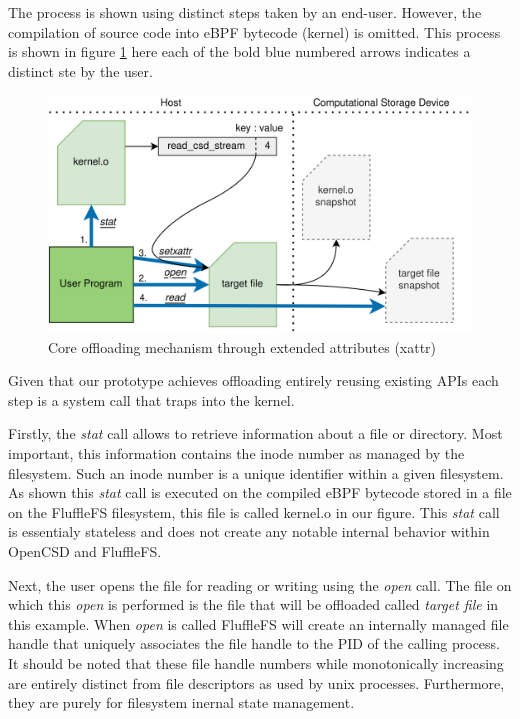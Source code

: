 The process is shown using distinct steps taken by an end-user. However, the
compilation of source code into eBPF bytecode (kernel) is omitted. This process
is shown in figure \ref{figure:offloading} here each of the bold blue numbered
arrows indicates a distinct ste by the user.

\begin{figure}
    \centering
	\includegraphics[width=1\textwidth]{resources/images/offloading.png}
	\caption{Core offloading mechanism through extended attributes (xattr)}
    \label{figure:offloading}
\end{figure}

Given that our prototype achieves offloading entirely reusing existing APIs each
step is a system call that traps into the kernel.

Firstly, the \textit{stat} call allows to retrieve information about a file or
directory. Most important, this information contains the inode number as managed
by the filesystem. Such an inode number is a unique identifier within a given
filesystem. As shown this \textit{stat} call is executed on the compiled eBPF
bytecode stored in a file on the FluffleFS filesystem, this file is called
kernel.o in our figure. This \textit{stat} call is essentialy stateless and does
not create any notable internal behavior within OpenCSD and FluffleFS.

Next, the user opens the file for reading or writing using the \textit{open}
call. The file on which this \textit{open} is performed is the file that will be
offloaded called \textit{target file} in this example. When \textit{open} is
called FluffleFS will create an internally managed file handle that uniquely
associates the file handle to the PID of the calling process. It should be noted
that these file handle numbers while monotonically increasing are entirely
distinct from file descriptors as used by unix processes. Furthermore, they are
purely for filesystem inernal state management.

